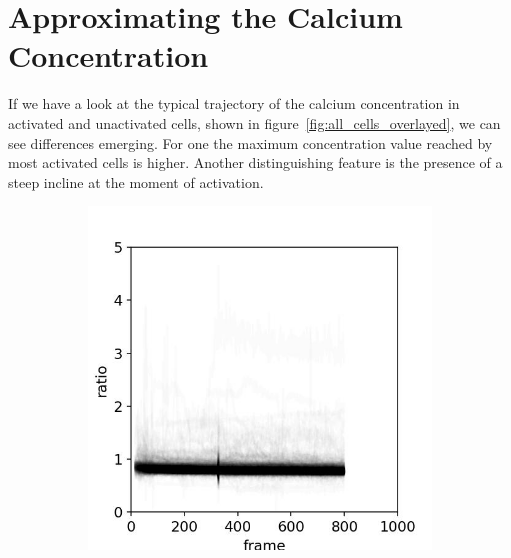 \chapter{Approximating the Calcium Concentration}
\label{chapter:approximating}

If we have a look at the typical trajectory of the calcium concentration in activated and unactivated cells, shown in figure~\ref{fig:all_cells_overlayed}, we can see differences emerging. For one the maximum concentration value reached by most activated cells is higher. Another distinguishing feature is the presence of a steep incline at the moment of activation.

\begin{figure}
	\centering
	\begin{subfigure}{0.45\linewidth}
		\includegraphics[width=\textwidth]{fig/all_cells_overlayed_mouse_neg}
	\end{subfigure}
	\hfill
	\begin{subfigure}{0.45\linewidth}

\end{subfigure}
\end{figure}
